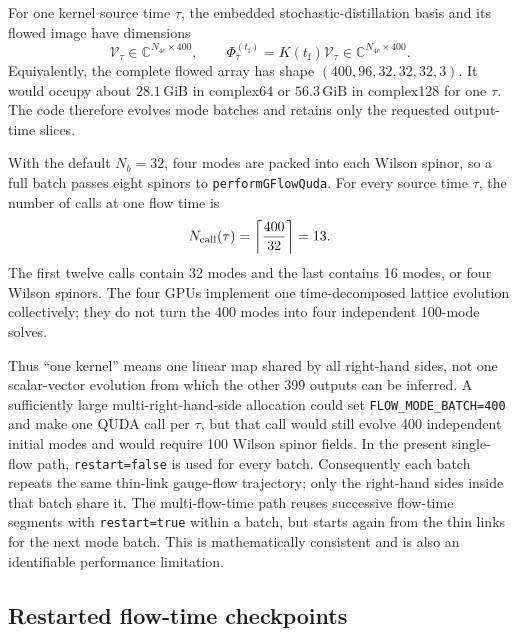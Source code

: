 \documentclass[11pt]{article}
\numberwithin{equation}{section}
\newcommand{\tf}{t_{\mathrm f}}
\begin{document}
For one kernel source time \(\tau\), the embedded stochastic-distillation
basis and its flowed image have dimensions
\begin{equation}
  \mathcal V_\tau\in\mathbb C^{N_{4c}\times400},
  \qquad
  \Phi_\tau^{(\tf)}=K(\tf)\mathcal V_\tau
  \in\mathbb C^{N_{4c}\times400}.
  \label{eq:k-v-dimension}
\end{equation}
Equivalently, the complete flowed array has shape
\((400,96,32,32,32,3)\).  It would occupy about \(28.1\,\mathrm{GiB}\) in
complex64 or \(56.3\,\mathrm{GiB}\) in complex128 for one \(\tau\).  The code
therefore evolves mode batches and retains only the requested output-time
slices.

With the default \(N_b=32\), four modes are packed into each Wilson spinor,
so a full batch passes eight spinors to \texttt{performGFlowQuda}.  For every
source time \(\tau\), the number of calls at one flow time is
\begin{equation}
  N_{\rm call}(\tau)
  =\left\lceil\frac{400}{32}\right\rceil
  =13.
  \label{eq:gflow-call-count}
\end{equation}
The first twelve calls contain 32 modes and the last contains 16 modes, or
four Wilson spinors.  The four GPUs implement one time-decomposed lattice
evolution collectively; they do not turn the 400 modes into four independent
100-mode solves.

Thus ``one kernel'' means one linear map shared by all right-hand sides, not
one scalar-vector evolution from which the other 399 outputs can be inferred.
A sufficiently large multi-right-hand-side allocation could set
\texttt{FLOW\_MODE\_BATCH=400} and make one QUDA call per \(\tau\), but that
call would still evolve 400 independent initial modes and would require 100
Wilson spinor fields.  In the present single-flow path,
\texttt{restart=false} is used for every batch.  Consequently each batch
repeats the same thin-link gauge-flow trajectory; only the right-hand sides
inside that batch share it.  The multi-flow-time path reuses successive
flow-time segments with \texttt{restart=true} within a batch, but starts again
from the thin links for the next mode batch.  This is mathematically
consistent and is also an identifiable performance limitation.

\subsection{Restarted flow-time checkpoints}
\end{document}
